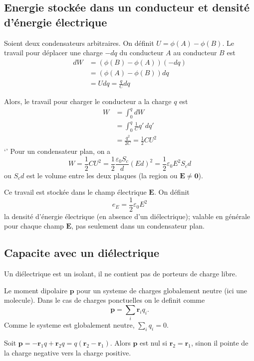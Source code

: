 \subsection{Energie stockée dans un conducteur et densité d'énergie électrique}

Soient deux condensateurs arbitraires. On définit $U=\phi(A)-\phi(B)$. Le travail pour déplacer une charge $-dq$ du conducteur $A$ au conducteur $B$ est 
\begin{align*}
dW & =(\phi(B)-\phi(A))(-dq) \\
 & =(\phi(A)-\phi(B))dq \\
 & =Udq=\frac{q}{C}dq
\end{align*}

Alors, le travail pour charger le conducteur a la charge $q$ est
\begin{align*}
W & =\int_{0}^{q} dW \\
 & =\int_{0}^{q} \frac{1}{C}q' \, dq' \\
 &  =\frac{q^{2}}{2C}=\frac{1}{2}CU^{2} 
\end{align*}`'
Pour un condensateur plan, on a 
$$
W=\frac{1}{2}CU^{2}=\frac{1}{2} \frac{\varepsilon_{0}S_{c}}{d}(Ed)^{2}=\frac{1}{2}\varepsilon_{0}E^{2}S_{c}d
$$
ou $S_{c}d$ est le volume entre les deux plaques (la region ou $\boldsymbol{E}\neq \boldsymbol{0}$).

Ce travail est stockée dans le champ électrique $\boldsymbol{E}$. On définit
$$
e_{E}=\frac{1}{2}\varepsilon_{0}E^{2}
$$
la densité d'énergie électrique (en absence d'un diélectrique); valable en générale pour chaque champ $\boldsymbol{E}$, pas seulement dans un condensateur plan.  

\subsection{Capacite avec un diélectrique}
\begin{definition}
Un diélectrique est un isolant, il ne contient pas de porteurs de charge libre.
\end{definition}
\begin{definition}
Le moment dipolaire $\boldsymbol{p}$ pour un systeme de charges globalement neutre (ici une molecule). Dans le cas de charges ponctuelles on le definit comme
$$
\boldsymbol{p}=\sum _{i}\boldsymbol{r}_{i}q_{i}.
$$
Comme le systeme est globalement neutre, $\sum _{i}q_{i}=0$.
\end{definition}
\begin{example}
Soit $\boldsymbol{p}=-\boldsymbol{r}_{1}q+\boldsymbol{r}_{2}q=q(\boldsymbol{r}_{2}-\boldsymbol{r}_{1})$. Alors $\boldsymbol{p}$ est nul si $\boldsymbol{r}_{2}=\boldsymbol{r}_{1}$, sinon il pointe de la charge negative vers la charge positive.
\end{example}
